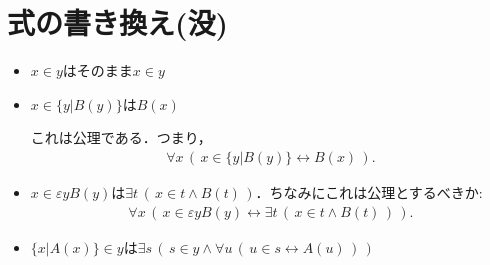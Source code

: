 \documentclass[a4j,10.5pt,oneside,openany]{jsbook}
\theoremstyle{mystyle}
\begin{document}
\section{式の書き換え(没)}
	\begin{itemize}
		\item $x \in y$はそのまま$x \in y$
		\item $x \in \{y|B(y)\}$は$B(x)$
			
			これは公理である．つまり，
			\begin{align}
				\forall x\, \left(\, x \in \{y|B(y)\} \leftrightarrow B(x)\, \right).
			\end{align}
			
		\item $x \in \varepsilon y B(y)$は$\exists t\, \left(\, x \in t \wedge B(t)\, \right)$．ちなみにこれは公理とするべきか:
			\begin{align}
				\forall x\, \left(\, x \in \varepsilon y B(y) \leftrightarrow
				\exists t\, \left(\, x \in t \wedge B(t)\, \right)\, \right).
			\end{align}
			
		\item $\{x|A(x)\} \in y$は$\exists s\, \left(\, s \in y \wedge 
			\forall u\, \left(\, u \in s \leftrightarrow A(u)\, \right)\, \right)$
			

\end{itemize}
\end{document}
